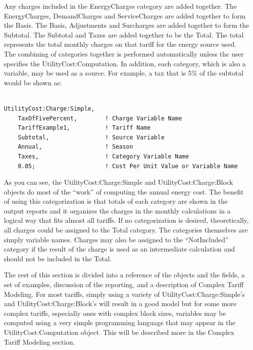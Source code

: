 Any charges included in the EnergyCharges category are added together. The EnergyCharges, DemandCharges and ServiceCharges are added together to form the Basis. The Basis, Adjustments and Surcharges are added together to form the Subtotal. The Subtotal and Taxes are added together to be the Total. The total represents the total monthly charges on that tariff for the energy source used. The combining of categories together is performed automatically unless the user specifies the UtilityCost:Computation. In addition, each category, which is also a variable, may be used as a source. For example, a tax that is 5\% of the subtotal would be shown as:

\begin{lstlisting}

UtilityCost:Charge:Simple,
    TaxOfFivePercent,        ! Charge Variable Name
    TariffExample1,          ! Tariff Name
    Subtotal,                ! Source Variable
    Annual,                  ! Season
    Taxes,                   ! Category Variable Name
    0.05;                    ! Cost Per Unit Value or Variable Name
\end{lstlisting}

As you can see, the UtilityCost:Charge:Simple and UtilityCost:Charge:Block objects do most of the ``work'' of computing the annual energy cost. The benefit of using this categorization is that totals of each category are shown in the output reports and it organizes the charges in the monthly calculations in a logical way that fits almost all tariffs. If no categorization is desired, theoretically, all charges could be assigned to the Total category. The categories themselves are simply variable names. Charges may also be assigned to the ``NotIncluded'' category if the result of the charge is used as an intermediate calculation and should not be included in the Total.

The rest of this section is divided into a reference of the objects and the fields, a set of examples, discussion of the reporting, and a description of Complex Tariff Modeling. For most tariffs, simply using a variety of UtilityCost:Charge:Simple's and UtilityCost:Charge:Block's will result in a good model but for some more complex tariffs, especially ones with complex block sizes, variables may be computed using a very simple programming language that may appear in the UtilityCost:Computation object. This will be described more in the Complex Tariff Modeling section.